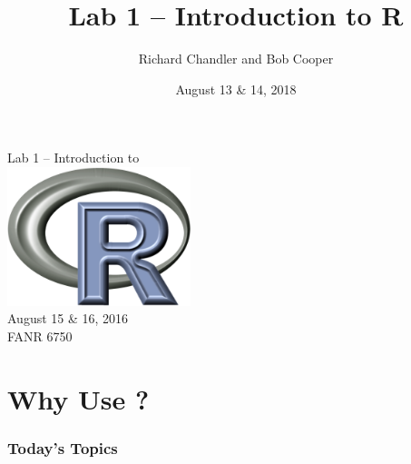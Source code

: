 \documentclass[color=usenames,dvipsnames]{beamer}\usepackage[]{graphicx}\usepackage[]{color}
\title{Lab 1 -- Introduction to {\bf R}}
\author{Richard Chandler and Bob Cooper}
\date{August 13 \& 14, 2018}
\begin{document}
\setlength\fboxsep{0pt}



\begin{frame}[plain]
  \LARGE
  {\centering
  {\Huge Lab 1 -- Introduction to \R} \\
  \vspace{0.9cm}
  \includegraphics[width=0.4\textwidth]{figs/Rlogo} \\
  \vspace{0.5cm}
  August 15 \& 16, 2016 \\
  FANR 6750 \par}
\end{frame}




\section{Why Use \R?}


\begin{frame}[plain]
  \frametitle{Today's Topics}
  \Large
\end{frame}
\end{document}
